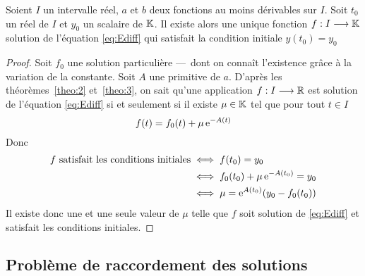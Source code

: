 \begin{theo}
    \label{theo:4}
    Soient \(I\) un intervalle réel, \(a\) et \(b\) deux fonctions au moins 
    dérivables sur \(I\). Soit \(t_0\) un réel de \(I\) et \(y_0\) un scalaire 
    de \(\mathbb{K}\). Il existe alors une unique fonction \(f:I \longrightarrow \mathbb{K}\) 
    solution de l'équation \eqref{eq:Ediff} qui satisfait la condition initiale 
    \(y(t_0) = y_0\)
\end{theo}

\begin{proof}
  Soit \(f_0\) une solution particulière ---~dont on connaît l'existence grâce à 
  la variation de la constante. Soit \(A\) une primitive de \(a\). D'après les 
  théorèmes~\ref{theo:2} et~\ref{theo:3}, on sait qu'une application 
  \(f:I \longrightarrow \mathbb{R}\) est solution de l'équation \eqref{eq:Ediff} si et 
  seulement si il existe \(\mu \in \mathbb{K}\) tel que pour tout \(t \in I\)
  \begin{equation}
    f(t) = f_0(t) + \mu \operatorname{e}^{-A(t)}
  \end{equation}
Donc 
\begin{align}
    f \text{~satisfait les conditions initiales} & \iff f(t_0) = y_0 \\ 
                                                 & \iff f_0(t_0) + 
                                                 \mu\operatorname{e}^{-A(t_0)} = y_0 \\
                                                 & \iff \mu = 
                                                 \operatorname{e}^{A(t_0)}(y_0-f_0(t_0))
\end{align}
Il existe donc une et une seule valeur de \(\mu\) telle que \(f\) soit solution 
de \eqref{eq:Ediff} et satisfait les conditions initiales.
\end{proof}

\subsection{Problème de raccordement des solutions}
\label{subsec:pbmraccordement}

